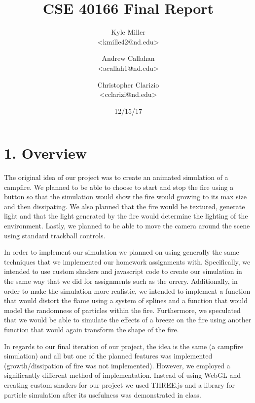 \documentclass[letterpaper]{article}
\begin{document}

\title{CSE 40166 Final Report}
\date{12/15/17}
\author{Kyle Miller\\ {\textless}kmille42@nd.edu{\textgreater} \and Andrew Callahan\\ {\textless}acallah1@nd.edu{\textgreater} \and Christopher Clarizio\\ {\textless}cclarizi@nd.edu{\textgreater}}

\maketitle


\section*{1. Overview}

\paragraph{}
	The original idea of our project was to create an animated simulation of a campfire. We planned to be able to choose to start and stop the fire using a button so that the simulation would show the fire would growing to its max size and then dissipating. We also planned that the fire would be textured, generate light and that the light generated by the fire would determine the lighting of the environment. Lastly, we planned to be able to move the camera around the scene using standard trackball controls.

    In order to implement our simulation we planned on using generally the same techniques that we implemented our homework assignments with. Specifically, we intended to use custom shaders and javascript code to create our simulation in the same way that we did for assignments such as the orrery. Additionally, in order to make the simulation more realistic, we intended to implement a function that would distort the flame using a system of splines and a function that would model the randomness of particles within the fire. Furthermore, we speculated that we would be able to simulate the effects of a breeze on the fire using another function that would again transform the shape of the fire.
    
    In regards to our final iteration of our project, the idea is the same (a campfire simulation) and all but one of the planned features was implemented (growth/dissipation of fire was not implemented). However, we employed a significantly different method of implementation. Instead of using WebGL and creating custom shaders for our project we used THREE.js and a library for particle simulation after its usefulness was demonstrated in class.
    
\end{document}
